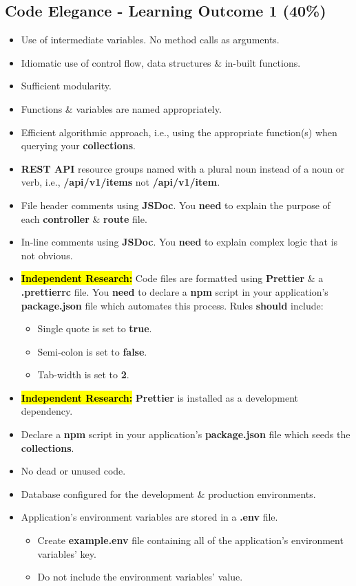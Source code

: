 \documentclass{article}
\begin{document}
\subsection*{Code Elegance - Learning Outcome 1 (40\%)}
\begin{itemize}
	\item Use of intermediate variables. No method calls as arguments.
	\item Idiomatic use of control flow, data structures \& in-built functions.
	\item Sufficient modularity.
	\item Functions \& variables are named appropriately.
	\item Efficient algorithmic approach, i.e., using the appropriate function(s) when querying your \textbf{collections}.
	\item \textbf{REST API} resource groups named with a plural noun instead of a noun or verb, i.e., \textbf{/api/v1/items} not \textbf{/api/v1/item}.
	\item File header comments using \textbf{JSDoc}. You \textbf{need} to explain the purpose of each \textbf{controller} \& \textbf{route} file.
	\item In-line comments using \textbf{JSDoc}. You \textbf{need} to explain complex logic that is not obvious.
	\item \hl{\textbf{Independent Research:}} Code files are formatted using \textbf{Prettier} \& a \textbf{.prettierrc} file. You \textbf{need} to declare a \textbf{npm} script in your application's \textbf{package.json} file which automates this process. Rules \textbf{should} include:
	      \begin{itemize}
		      \item Single quote is set to \textbf{true}.
		      \item Semi-colon is set to \textbf{false}.
		      \item Tab-width is set to \textbf{2}.
	      \end{itemize}
	\item \hl{\textbf{Independent Research:}} \textbf{Prettier} is installed as a development dependency.
	\item Declare a \textbf{npm} script in your application's \textbf{package.json} file which seeds the \textbf{collections}.
	\item No dead or unused code.
	\item Database configured for the development \& production environments.
	\item Application's environment variables are stored in a \textbf{.env} file.
	\begin{itemize}
		\item Create \textbf{example.env} file containing all of the application's environment variables' key. 
		\item Do not include the environment variables' value.  
	\end{itemize}  
\end{itemize}
\end{document}
